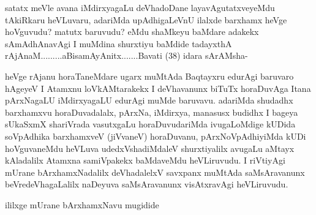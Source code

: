 \begin{artha}
satatx meVle avana iMdirxyagaLu deVhadoDane layavAgutatxveyeMdu tAkiRkaru heVLuvaru, adariMda upAdhigaLeVnU ilalxde barxhamx heVge hoVguvudu? matutx baruvudu? eMdu shaMkeyu baMdare adakekx sAmAdhAnavAgi I muMdina shurxtiyu baMdide tadayxthA rAjAnaM.........aBisamAyAnitx.......Bavati (38) idara sArAMsha-
\end{artha}

\begin{artha}
heVge rAjanu horaTaneMdare ugarx muMtAda Baqtayxru edurAgi baruvaro hAgeyeV I Atamxnu loVkAMtarakekx I deVhavanunx biTuTx horaDuvAga Itana pArxNagaLU iMdirxyagaLU edurAgi muMde baruvavu. adariMda shudadhx barxhamxvu horaDuvadalalx, pArxNa, iMdirxya, manasusx budidhx I bageya sUkaSxmX shariVrada vasutxgaLu horaDuvudariMda ivugaLoMdige kUDida soVpAdhika barxhamxveV (jiVvaneV) horaDuvanu, pArxNoVpAdhiyiMda kUDi hoVguvaneMdu heVLuva udedxVshadiMdaleV shurxtiyalilx avugaLu aMtayx kAladalilx Atamxna samiVpakekx baMdaveMdu heVLiruvudu. I riVtiyAgi mUrane bArxhamxNadalilx deVhadalelxV savxpanx muMtAda saMsAravanunx beVredeVhagaLalilx naDeyuva saMsAravanunx visAtxravAgi heVLiruvudu.
\end{artha}

\begin{center}
ililxge mUrane bArxhamxNavu mugidide
\end{center}

